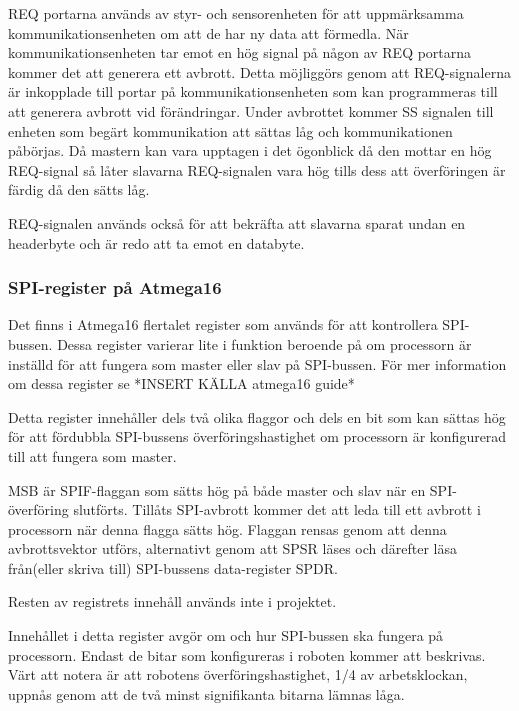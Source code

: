 REQ portarna används av styr- och sensorenheten för att uppmärksamma kommunikationsenheten om att de har ny data att förmedla. När kommunikationsenheten tar emot en hög signal på någon av REQ portarna kommer det att generera ett avbrott. Detta möjliggörs genom att REQ-signalerna är inkopplade till portar på kommunikationsenheten som kan programmeras till att generera avbrott vid förändringar. Under avbrottet kommer SS signalen till enheten som begärt kommunikation att sättas låg och kommunikationen påbörjas. Då mastern kan vara upptagen i det ögonblick då den mottar en hög REQ-signal så låter slavarna REQ-signalen vara hög tills dess att överföringen är färdig då den sätts låg.

REQ-signalen används också för att bekräfta att slavarna sparat undan en headerbyte och är redo att ta emot en databyte. 

\subsubsection{SPI-register på Atmega16}

Det finns i Atmega16 flertalet register som används för att kontrollera SPI-bussen. Dessa register varierar lite i funktion beroende på om processorn är inställd för att fungera som master eller slav på SPI-bussen. För mer information om dessa register se *INSERT KÄLLA atmega16 guide*

Detta register innehåller dels två olika flaggor och dels en bit som kan sättas hög för att fördubbla SPI-bussens överföringshastighet om processorn är konfigurerad till att fungera som master. 

MSB är SPIF-flaggan som sätts hög på både master och slav när en SPI-överföring slutförts. Tillåts SPI-avbrott kommer det att leda till ett avbrott i processorn när denna flagga sätts hög. Flaggan rensas genom att denna avbrottsvektor utförs, alternativt genom att SPSR läses och därefter läsa från(eller skriva till) SPI-bussens data-register SPDR.

Resten av registrets innehåll används inte i projektet.

Innehållet i detta register avgör om och hur SPI-bussen ska fungera på processorn. Endast de bitar som konfigureras i roboten kommer att beskrivas. Värt att notera är att robotens överföringshastighet, 1/4 av arbetsklockan, uppnås genom att de två minst signifikanta bitarna lämnas låga.

